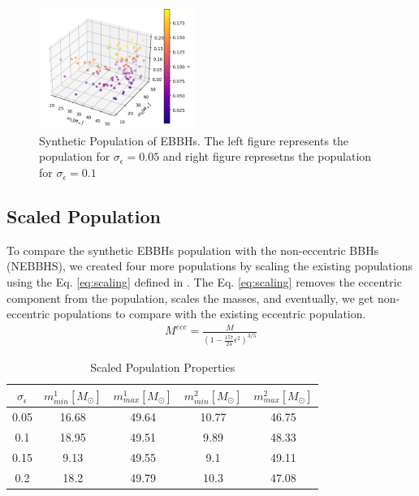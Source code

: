 \documentclass[twocolumn,prd,nofootinbib]{revtex4}
\begin{document}
\begin{figure}[H]

\includegraphics[width=0.45\textwidth]{paper/figures/pop3d0.2.png}
\caption{\label{fig:pop3d0.2} Synthetic Population of EBBHs. The left figure represents the population for $\sigma_\epsilon=0.05$ and right figure represetns the population for $\sigma_\epsilon=0.1$}

\end{figure}


\subsection{Scaled Population}

To compare the synthetic EBBHs population with the non-eccentric BBHs (NEBBHS), we created four more populations by scaling the existing populations using the Eq. \ref{eq:scaling} defined in \cite{2021_scaling_paper}. The Eq. \ref{eq:scaling} removes the eccentric component from the population, scales the masses, and eventually, we get non-eccentric populations to compare with the existing eccentric population.
\begin{align}
\label{eq:scaling}
M^{ecc} = \frac{M}{(1-\frac{157}{24}\epsilon^2)^{3/5}}
\end{align}




\begin{table}[]
    \centering
    \begin{tabular}{|ccccc|}
        \hline
        $\sigma_\epsilon$ & $m^1_{min} [M_\odot] $ & $m^1_{max} [M_\odot]$ & $m^2_{min} [M_\odot]$ & $m^2_{max} [M_\odot]$ \\ \hline
        0.05 & 16.68 & 49.64 & 10.77 & 46.75 \\ \hline
        0.1 & 18.95 & 49.51 & 9.89 & 48.33 \\ \hline
        0.15 & 9.13 & 49.55 & 9.1 & 49.11  \\ \hline
        0.2 & 18.2 & 49.79 & 10.3 & 47.08  \\ \hline
    \end{tabular}
    \caption{Scaled Population Properties}
    \label{tab:popscl_prop}
\end{table}
 
\end{document}
